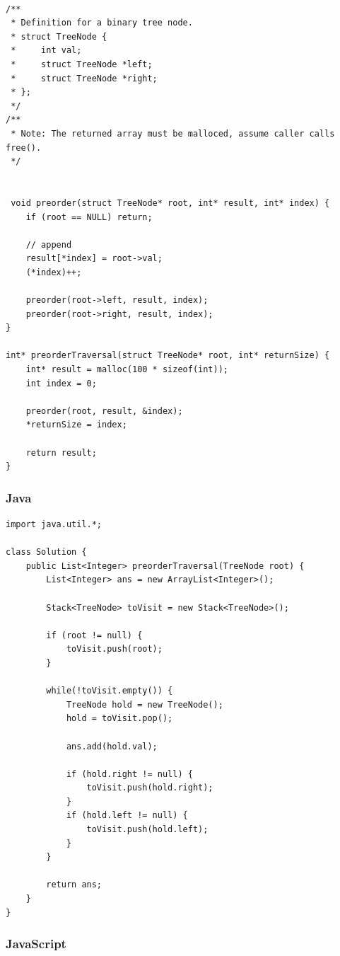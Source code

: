 \documentclass[11pt]{article}
\begin{document}
\begin{verbatim}

/**
 * Definition for a binary tree node.
 * struct TreeNode {
 *     int val;
 *     struct TreeNode *left;
 *     struct TreeNode *right;
 * };
 */
/**
 * Note: The returned array must be malloced, assume caller calls free().
 */


 void preorder(struct TreeNode* root, int* result, int* index) {
    if (root == NULL) return;

    // append
    result[*index] = root->val;
    (*index)++;

    preorder(root->left, result, index);
    preorder(root->right, result, index);
}

int* preorderTraversal(struct TreeNode* root, int* returnSize) {
    int* result = malloc(100 * sizeof(int));
    int index = 0;

    preorder(root, result, &index);
    *returnSize = index;

    return result;
}

\end{verbatim}


\subsubsection{Java}

\begin{verbatim}
import java.util.*;

class Solution {
    public List<Integer> preorderTraversal(TreeNode root) {
        List<Integer> ans = new ArrayList<Integer>();

        Stack<TreeNode> toVisit = new Stack<TreeNode>();

        if (root != null) {
            toVisit.push(root);
        }

        while(!toVisit.empty()) {
            TreeNode hold = new TreeNode();
            hold = toVisit.pop();

            ans.add(hold.val);

            if (hold.right != null) {
                toVisit.push(hold.right);
            }
            if (hold.left != null) {
                toVisit.push(hold.left);
            }
        }

        return ans;
    }
}
\end{verbatim}

\subsubsection{JavaScript}
\end{document}
